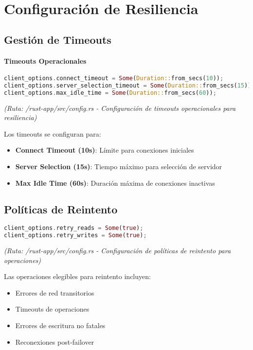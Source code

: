 \documentclass[12pt,letterpaper]{article}
\begin{document}
\section{Configuración de Resiliencia}
\subsection{Gestión de Timeouts}
\paragraph{Timeouts Operacionales}
\begin{lstlisting}[language=rust]
client_options.connect_timeout = Some(Duration::from_secs(10));
client_options.server_selection_timeout = Some(Duration::from_secs(15));
client_options.max_idle_time = Some(Duration::from_secs(60));
\end{lstlisting}
\textit{(Ruta: /rust-app/src/config.rs - Configuración de timeouts operacionales para resiliencia)}

Los timeouts se configuran para:
\begin{itemize}
    \item \textbf{Connect Timeout (10s)}: Límite para conexiones iniciales
    \item \textbf{Server Selection (15s)}: Tiempo máximo para selección de servidor
    \item \textbf{Max Idle Time (60s)}: Duración máxima de conexiones inactivas
\end{itemize}

\subsection{Políticas de Reintento}
\begin{lstlisting}[language=rust]
client_options.retry_reads = Some(true);
client_options.retry_writes = Some(true);
\end{lstlisting}
\textit{(Ruta: /rust-app/src/config.rs - Configuración de políticas de reintento para operaciones)}

Las operaciones elegibles para reintento incluyen:
\begin{itemize}
    \item Errores de red transitorios
    \item Timeouts de operaciones
    \item Errores de escritura no fatales
    \item Reconexiones post-failover
\end{itemize}
\end{document}
